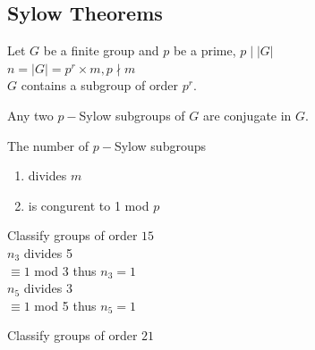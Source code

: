 \subsection{Sylow Theorems}


\begin{theorem}
    Let $G$ be a finite group and $p$ be a prime, $p\mid |G|$\\
$n=|G|=p^r\times m, p \nmid m$\\
    $G$ contains a subgroup of order $p^r$.
\end{theorem}
\begin{theorem}
    Any two $p-$Sylow subgroups of $G$ are conjugate in $G$.
\end{theorem}
\begin{theorem}
    The number of $p-$Sylow subgroups
    \begin{enumerate}
        \item divides $m$
        \item is congurent to 1 mod $p$
    \end{enumerate}
\end{theorem}

\begin{example}
    Classify groups of order $15$\\
    $n_3$ divides 5\\
    $\equiv 1$ mod 3 thus $n_3=1$\\
    $n_5$ divides 3\\
    $\equiv 1$ mod 5 thus $n_5=1$\\
\end{example}

\begin{example}
    Classify groups of order $21$\\
\end{example}
